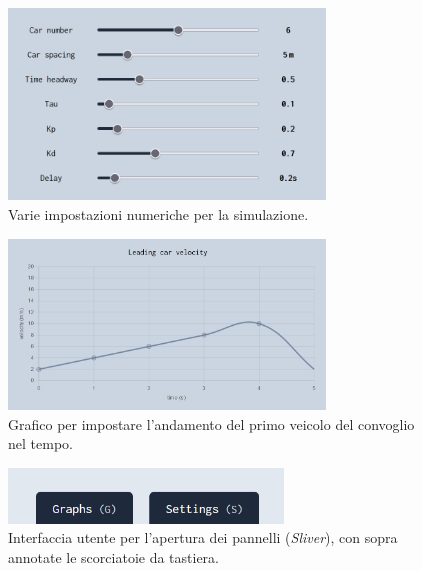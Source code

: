 \begin{figure}[H]
    \vspace{0.7em}
    \centering
    \includegraphics[width=0.75\textwidth, keepaspectratio]{images/4-frontend/simulation-settings.png}
    \caption{Varie impostazioni numeriche per la simulazione.}
    \label{fig:simulation-settings}
\end{figure}

\begin{figure}[H]
    \vspace{0.5em}
    \centering
    \captionsetup{justification=centering, margin=2cm}
    \includegraphics[width=0.75\textwidth, keepaspectratio]{images/4-frontend/velocity-settings.png}
    \caption{Grafico per impostare l'andamento del primo veicolo del convoglio nel tempo.}
    \label{fig:velocity-settings}
\end{figure}

\begin{figure}[H]
    \centering
    \captionsetup{justification=centering, margin=2cm}
    \includegraphics[width=0.65\textwidth, keepaspectratio]{images/4-frontend/keyboard-shortcuts.png}
    \caption{Interfaccia utente per l'apertura dei pannelli (\textit{Sliver}), con sopra annotate le scorciatoie da tastiera.}
    \label{fig:keyboard-shortcuts}
\end{figure}

